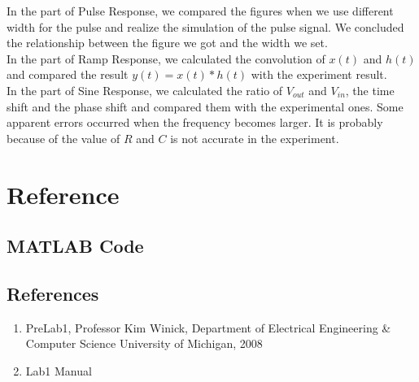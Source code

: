 \documentclass{article}
\begin{document}
In the part of Pulse Response, we compared the figures when we use different width for the pulse and realize the simulation of the pulse signal. We concluded the relationship between the figure we got and the width we set.\\

In the part of Ramp Response, we calculated the convolution of $x(t)$ and $h(t)$ and compared the result $y(t)=x(t)*h(t)$ with the experiment result.\\

In the part of Sine Response, we calculated the ratio of $V_{out}$ and $V_{in}$, the time shift and the phase shift and compared them with the experimental ones. Some apparent errors occurred when the frequency becomes larger. It is probably because of the value of $R$ and $C$ is not accurate in the experiment.

\section{Reference}

\subsection{MATLAB Code}
\begin{minipage}{0.02\linewidth}
\phantom{1}
\end{minipage}
\begin{minipage}{0.9\linewidth}
\end{minipage}

\subsection{References}
\begin{enumerate}
	\item PreLab1, Professor Kim Winick, Department of Electrical Engineering \& Computer Science University of Michigan, 2008
	\item Lab1 Manual
\end{enumerate}
\end{document}

